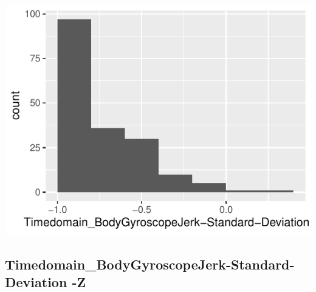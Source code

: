 \documentclass[
]{article}
\begin{document}
\begin{minipage}{0.25 \textwidth}

\includegraphics{codebook_tidydatasub_files/figure-latex/Var-31-Timedomain-BodyGyroscopeJerk-Standard-Deviation--Y-1.pdf}

\end{minipage}

\noindent\makebox[\linewidth]{\rule{\textwidth}{0.4pt}}

\hypertarget{timedomain_bodygyroscopejerk-standard-deviation--z}{%
\subsection{Timedomain\_BodyGyroscopeJerk-Standard-Deviation
-Z}\label{timedomain_bodygyroscopejerk-standard-deviation--z}}
\end{document}

